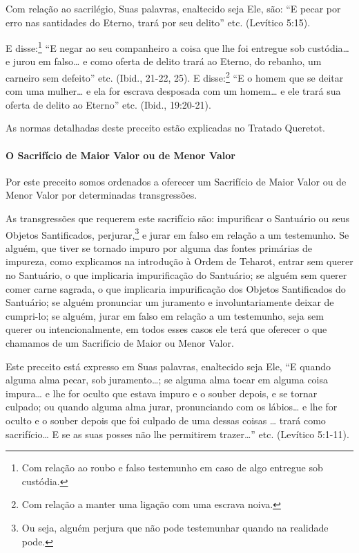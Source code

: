 Com relação ao sacrilégio, Suas palavras, enaltecido seja Ele, são: ``E
pecar por erro nas santidades do Eterno, trará por seu delito'' etc.
(Levítico 5:15).

E disse:\footnote{Com relação ao roubo e falso testemunho em caso de algo entregue sob
  custódia.} ``E negar ao seu companheiro a coisa que
lhe foi entregue sob custódia\ldots{} e jurou em falso\ldots{} e como
oferta de delito trará ao Eterno, do rebanho, um carneiro sem defeito''
etc. (Ibid., 21-22, 25). E disse:\footnote{Com relação a manter uma ligação com uma escrava noiva.} ``E o homem que
se deitar com uma mulher\ldots{} e ela for escrava desposada com um
homem\ldots{} e ele trará sua oferta de delito ao Eterno'' etc. (Ibid.,
19:20-21).

As normas detalhadas deste preceito estão explicadas no Tratado
Queretot.

\paragraph{O Sacrifício de Maior Valor ou de Menor Valor}

Por este preceito somos ordenados a oferecer um Sacrifício de Maior
Valor ou de Menor Valor por determinadas transgressões.

As transgressões que requerem este sacrifício são: impurificar o
Santuário ou seus Objetos Santificados, perjurar,\footnote{Ou seja, alguém perjura que não pode testemunhar quando na realidade
  pode.} e
jurar em falso em relação a um testemunho. Se alguém, que tiver se
tornado impuro por alguma das fontes primárias de impureza, como explicamos na
introdução à Ordem de Teharot, entrar sem querer no Santuário, o que
implicaria impurificação do Santuário; se alguém sem querer comer carne
sagrada, o que implicaria impurificação dos Objetos Santificados do
Santuário; se alguém pronunciar um juramento e involuntariamente deixar
de cumpri-lo; se alguém, jurar em falso em relação a um testemunho, seja
sem querer ou intencionalmente, em todos esses casos ele terá que
oferecer o que chamamos de um Sacrifício de Maior ou Menor Valor.

Este preceito está expresso em Suas palavras, enaltecido seja Ele, ``E
quando alguma alma pecar, sob juramento\ldots{}; se alguma alma tocar em
alguma coisa impura\ldots{} e lhe for oculto que estava impuro e o souber
depois, e se tornar culpado; ou quando alguma alma jurar, pronunciando
com os lábios\ldots{} e lhe for oculto e o souber depois que foi culpado de
uma dessas coisas \ldots{} trará como sacrifício\ldots{} E se as suas posses não
lhe permitirem trazer\ldots{}'' etc. (Levítico 5:1-11).

